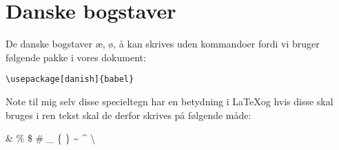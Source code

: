 \documentclass[class=report, crop=false]{standalone}
\begin{document}
    \section{Danske bogstaver}
    De danske bogstaver æ, ø, å kan skrives uden kommandoer fordi vi bruger følgende pakke i vores dokument:
    \begin{tcolorbox}
        \verb|\usepackage[danish]{babel}|
    \end{tcolorbox}
    \noindent Note til mig selv disse specieltegn har en betydning i \LaTeX og hvis disse skal bruges i ren tekst skal de derfor skrives på følgende måde:
    \begin{tcblisting}{}
        \& \% \$ \# \_ \{ \}
        \textasciitilde
        \textasciicircum
        \textbackslash
    \end{tcblisting}
\end{document}
